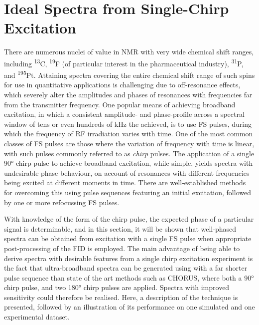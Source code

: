 \section{Ideal Spectra from Single-Chirp Excitation}
\label{sec:bbqchili}
There are numerous nuclei of value in \ac{NMR} with very wide chemical shift
ranges, including \textsuperscript{13}C, \textsuperscript{19}F (of
particular interest in the pharmaceutical industry), \textsuperscript{31}P, and
\textsuperscript{195}Pt.
Attaining spectra covering the entire chemical shift range of such spins for
use in quantitative applications is challenging due to off-resonance effects,
which severely alter the amplitudes and phases of resonances with frequencies
far from the transmitter frequency\cite[Section 3.4.1]{Cavanagh2007}. One
popular means of achieving broadband excitation, in which a consistent
amplitude- and phase-profile across a spectral window of tens or even hundreds
of \unit{\kilo\hertz} the achieved, is to use \ac{FS} pulses, during
which the frequency of \ac{RF} irradiation varies with
time\cite{Foroozandeh2020}. One of the most common classes of \ac{FS} pulses
are those where the variation of frequency with time is linear, with such
pulses commonly referred to as \emph{chirp} pulses. The application of a single
\ang{90} chirp pulse to achieve broadband excitation, while simple, yields
spectra with undesirable phase behaviour, on account of resonances with
different frequencies being excited at different moments in time.
There are well-established methods for overcoming this using
pulse sequences featuring an initial excitation, followed by one or more
refocussing \ac{FS}
pulses\cite{Bohlen1989,Bohlen1993,Cano2002,Power2016,Foroozandeh2019}.

With knowledge of the form of the chirp pulse, the expected phase of a
particular signal is determinable, and in this section, it will be shown
that well-phased spectra can be obtained from excitation with a single \ac{FS}
pulse when appropriate post-processing of the \ac{FID} is employed.
The main advantage of being able to derive spectra with desirable features from
a single chirp excitation experiment is the fact that ultra-broadband spectra
can be generated using with a far shorter pulse sequence than state of the art
methods such as \ac{CHORUS}\cite{Power2016,Foroozandeh2019}, where both a
\ang{90} chirp pulse, and two \ang{180} chirp pulses are applied. Spectra with
improved sensitivity could therefore be realised.  Here, a description of the
technique is presented, followed by an illustration of its performance on one
simulated and one experimental dataset.

